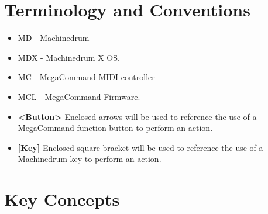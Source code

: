 \chapter{Terminology and Conventions}
   \begin{itemize}
      \item MD - Machinedrum
      \item MDX - Machinedrum X OS.
      \item MC - MegaCommand MIDI controller
      \item MCL - MegaCommand Firmware.
      \item \textbf{<Button> } Enclosed arrows will be used to reference the use of a MegaCommand function button to perform an action.
      \item \textbf{[Key] } Enclosed square bracket will be used to reference the use of a Machinedrum key to perform an action.

      
   \end{itemize}
   
\newpage
\chapter{Key Concepts}

